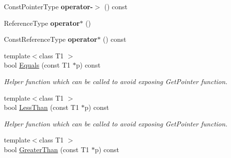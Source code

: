 \begin{DoxyCompactItemize}
\item 
\hypertarget{classLoki_1_1StrongPtr_ac14cb85bbadd4f14a56ca95ab8edd267}{}Const\+Pointer\+Type {\bfseries operator-\/$>$} () const \label{classLoki_1_1StrongPtr_ac14cb85bbadd4f14a56ca95ab8edd267}

\item 
\hypertarget{classLoki_1_1StrongPtr_a9042dba823a0e98e2de249f3b58989d4}{}Reference\+Type {\bfseries operator$\ast$} ()\label{classLoki_1_1StrongPtr_a9042dba823a0e98e2de249f3b58989d4}

\item 
\hypertarget{classLoki_1_1StrongPtr_aedca589290f5c6459449113364847c2a}{}Const\+Reference\+Type {\bfseries operator$\ast$} () const \label{classLoki_1_1StrongPtr_aedca589290f5c6459449113364847c2a}

\item 
\hypertarget{classLoki_1_1StrongPtr_a4fc54496091980f204b029558744430c}{}{\footnotesize template$<$class T1 $>$ }\\bool \hyperlink{classLoki_1_1StrongPtr_a4fc54496091980f204b029558744430c}{Equals} (const T1 $\ast$p) const \label{classLoki_1_1StrongPtr_a4fc54496091980f204b029558744430c}

\begin{DoxyCompactList}\small\item\em Helper function which can be called to avoid exposing Get\+Pointer function. \end{DoxyCompactList}\item 
\hypertarget{classLoki_1_1StrongPtr_ae15cebde2e8e7a3adcc2af8a72260105}{}{\footnotesize template$<$class T1 $>$ }\\bool \hyperlink{classLoki_1_1StrongPtr_ae15cebde2e8e7a3adcc2af8a72260105}{Less\+Than} (const T1 $\ast$p) const \label{classLoki_1_1StrongPtr_ae15cebde2e8e7a3adcc2af8a72260105}

\begin{DoxyCompactList}\small\item\em Helper function which can be called to avoid exposing Get\+Pointer function. \end{DoxyCompactList}\item 
\hypertarget{classLoki_1_1StrongPtr_a2077999f1cb9dc1388e2bbf41509084a}{}{\footnotesize template$<$class T1 $>$ }\\bool \hyperlink{classLoki_1_1StrongPtr_a2077999f1cb9dc1388e2bbf41509084a}{Greater\+Than} (const T1 $\ast$p) const \label{classLoki_1_1StrongPtr_a2077999f1cb9dc1388e2bbf41509084a}


\end{DoxyCompactItemize}
